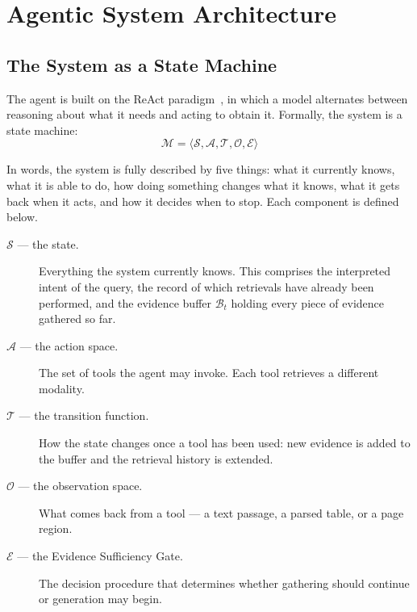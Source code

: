 \section{Agentic System Architecture}

\subsection{The System as a State Machine}

The agent is built on the ReAct paradigm~\cite{yao2023react}, in which a model alternates between
reasoning about what it needs and acting to obtain it. Formally, the system is a
state machine:
\begin{equation}
    \mathcal{M} = \langle \mathcal{S}, \mathcal{A}, \mathcal{T}, \mathcal{O}, \mathcal{E} \rangle
\end{equation}

\noindent In words, the system is fully described by five things: what it currently
knows, what it is able to do, how doing something changes what it knows, what it
gets back when it acts, and how it decides when to stop. Each component is defined
below.

\begin{description}
    \item[$\mathcal{S}$ --- the state.] Everything the system currently knows. This
    comprises the interpreted intent of the query, the record of which retrievals
    have already been performed, and the evidence buffer $\mathcal{B}_t$ holding
    every piece of evidence gathered so far.

    \item[$\mathcal{A}$ --- the action space.] The set of tools the agent may
    invoke. Each tool retrieves a different modality.

    \item[$\mathcal{T}$ --- the transition function.] How the state changes once a
    tool has been used: new evidence is added to the buffer and the retrieval
    history is extended.

    \item[$\mathcal{O}$ --- the observation space.] What comes back from a tool ---
    a text passage, a parsed table, or a page region.

    \item[$\mathcal{E}$ --- the Evidence Sufficiency Gate.] The decision procedure
    that determines whether gathering should continue or generation may begin.
\end{description}

